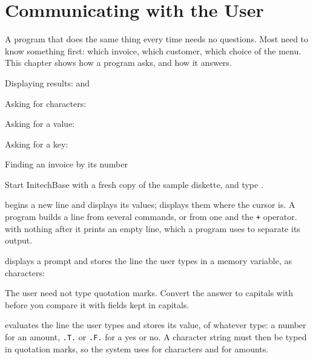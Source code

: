 \chapter{Communicating with the User}
A program that does the same thing every time needs no questions.  Most need to
know something first: which invoice, which customer, which choice of the menu.
This chapter shows how a program asks, and how it answers.

\begin{ChapterCovers}
\item Displaying results:  and 
\item Asking for characters: 
\item Asking for a value: 
\item Asking for a key: 
\item Finding an invoice by its number
\end{ChapterCovers}

Start InitechBase with a fresh copy of the sample diskette, and type
.

 begins a new line and displays its values;  displays them where
the cursor is.  A program builds a line from several  commands, or from
one  and the \texttt{+} operator.   with nothing after it prints an
empty line, which a program uses to separate its output.

 displays a prompt and stores the line the user types in a memory
variable, as characters:


The user need not type quotation marks.  Convert the answer to capitals with
 before you compare it with fields kept in capitals.

 evaluates the line the user types and stores its value, of whatever
type: a number for an amount, \texttt{.T.} or \texttt{.F.} for a yes or no.  A
character string must then be typed in quotation marks, so the system uses
 for characters and  for amounts.

